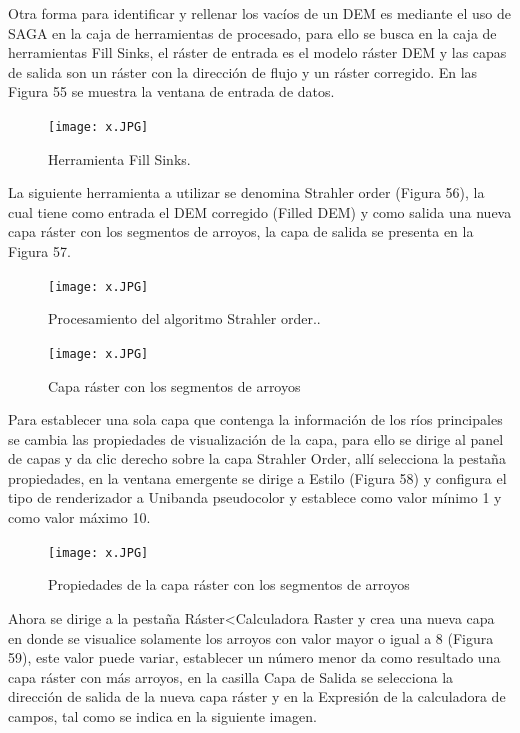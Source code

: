 \documentclass[12pt,hidelinks]{article}
\begin{document}
Otra forma para identificar y rellenar los vacíos de un DEM es mediante el uso de SAGA en la caja de herramientas de procesado, para ello se busca en la caja de herramientas Fill Sinks, el ráster de entrada es el modelo ráster DEM y las capas de salida son un ráster con la dirección de flujo y un ráster corregido. En las Figura 55 se muestra la ventana de entrada de datos.
\begin{figure}[H]
    \centering
    \texttt{[image: x.JPG]}
    \caption{ Herramienta Fill Sinks.}
 \label{fig:my_label}
\end{figure}
La siguiente herramienta a utilizar se denomina Strahler order (Figura 56), la cual tiene como entrada el DEM corregido (Filled DEM) y como salida una nueva capa ráster con los segmentos de arroyos, la capa de salida se presenta en la Figura 57.
\begin{figure}[H]
    \centering
    \texttt{[image: x.JPG]}
    \caption{Procesamiento del algoritmo Strahler order..}
 \label{fig:my_label}
\end{figure}
\begin{figure}[H]
    \centering
    \texttt{[image: x.JPG]}
    \caption{Capa ráster con los segmentos de arroyos}
 \label{fig:my_label}
\end{figure}
Para establecer una sola capa que contenga la información de los ríos principales se cambia las propiedades de visualización de la capa, para ello se dirige al panel de capas y da clic derecho sobre la capa Strahler Order, allí selecciona la pestaña propiedades, en la ventana emergente se dirige a Estilo (Figura 58) y configura el tipo de renderizador a Unibanda pseudocolor y establece como valor mínimo 1 y como valor máximo 10.
\begin{figure}[H]
    \centering
    \texttt{[image: x.JPG]}
    \caption{Propiedades de la capa ráster con los segmentos de arroyos }
 \label{fig:my_label}
\end{figure}
Ahora se dirige a la pestaña Ráster<Calculadora Raster y crea una nueva capa en donde se visualice solamente los arroyos con valor mayor o igual a 8 (Figura 59), este valor puede variar, establecer un número menor da como resultado una capa ráster con más arroyos, en la casilla Capa de Salida se selecciona la dirección de salida de la nueva capa ráster y en la Expresión de la calculadora de campos, tal como se indica en la siguiente imagen.
\end{document}
